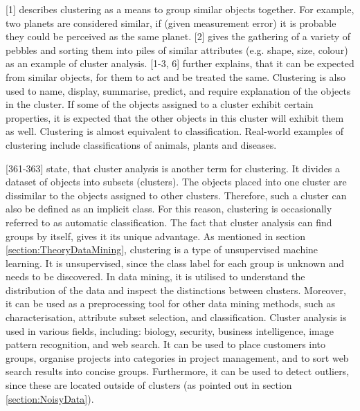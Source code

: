 


\textcite{hartigan1975clustering}[1] describes clustering as a means to group similar objects together. For example, two planets are considered similar, if (given measurement error) it is probable they could be perceived as the same planet. \textcite{romesburg2004cluster}[2] gives the gathering of a variety of pebbles and sorting them into piles of similar attributes (e.g. shape, size, colour) as an example of cluster analysis. \textcite{hartigan1975clustering}[1-3, 6] further explains, that it can be expected from similar objects, for them to act and be treated the same. Clustering is also used to name, display, summarise, predict, and require explanation of the objects in the cluster. If some of the objects assigned to a cluster exhibit certain properties, it is expected that the other objects in this cluster will exhibit them as well. Clustering is almost equivalent to classification. Real-world examples of clustering include classifications of animals, plants and diseases.

\textcite{han2011data}[361-363] state, that cluster analysis is another term for clustering. It divides a dataset of objects into subsets (clusters). The objects placed into one cluster are dissimilar to the objects assigned to other clusters. Therefore, such a cluster can also be defined as an implicit class. For this reason, clustering is occasionally referred to as automatic classification. The fact that cluster analysis can find groups by itself, gives it its unique advantage. As mentioned in section \ref{section:TheoryDataMining}, clustering is a type of unsupervised machine learning. It is unsupervised, since the class label for each group is unknown and needs to be discovered. In data mining, it is utilised to understand the distribution of the data and inspect the distinctions between clusters. Moreover, it can be used as a preprocessing tool for other data mining methods, such as characterisation, attribute subset selection, and classification.
Cluster analysis is used in various fields, including: biology, security, business intelligence, image pattern recognition, and web search. It can be used to place customers into groups, organise projects into categories in project management, and to sort web search results into concise groups. Furthermore, it can be used to detect outliers, since these are located outside of clusters (as pointed out in section \ref{section:NoisyData}).


